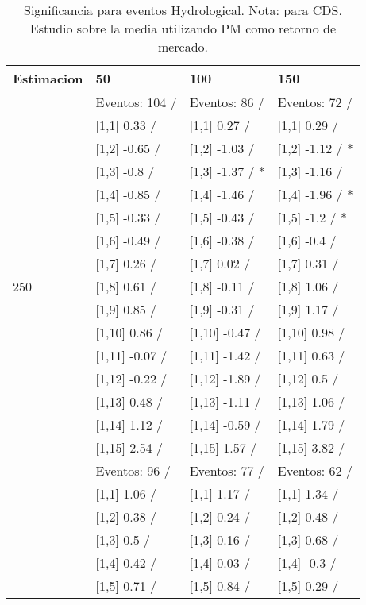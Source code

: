 \begin{table}

\caption{Significancia para eventos Hydrological. Nota: para CDS. Estudio sobre la media utilizando PM como retorno de mercado.}
\centering
\begin{tabular}[t]{llll}
\toprule
Estimacion & 50 & 100 & 150\\
\midrule
 & Eventos:  104 / & Eventos:  86 / & Eventos:  72 /\\
 & {}[1,1] 0.33  / & {}[1,1] 0.27  / & {}[1,1] 0.29  /\\
 & {}[1,2] -0.65  / & {}[1,2] -1.03  / & {}[1,2] -1.12  / *\\
 & {}[1,3] -0.8  / & {}[1,3] -1.37  / * & {}[1,3] -1.16  /\\
 & {}[1,4] -0.85  / & {}[1,4] -1.46  / & {}[1,4] -1.96  / *\\
\addlinespace
 & {}[1,5] -0.33  / & {}[1,5] -0.43  / & {}[1,5] -1.2  / *\\
 & {}[1,6] -0.49  / & {}[1,6] -0.38  / & {}[1,6] -0.4  /\\
 & {}[1,7] 0.26  / & {}[1,7] 0.02  / & {}[1,7] 0.31  /\\
250 & {}[1,8] 0.61  / & {}[1,8] -0.11  / & {}[1,8] 1.06  /\\
 & {}[1,9] 0.85  / & {}[1,9] -0.31  / & {}[1,9] 1.17  /\\
\addlinespace
 & {}[1,10] 0.86  / & {}[1,10] -0.47  / & {}[1,10] 0.98  /\\
 & {}[1,11] -0.07  / & {}[1,11] -1.42  / & {}[1,11] 0.63  /\\
 & {}[1,12] -0.22  / & {}[1,12] -1.89  / & {}[1,12] 0.5  /\\
 & {}[1,13] 0.48  / & {}[1,13] -1.11  / & {}[1,13] 1.06  /\\
 & {}[1,14] 1.12  / & {}[1,14] -0.59  / & {}[1,14] 1.79  /\\
\addlinespace
 & {}[1,15] 2.54  / & {}[1,15] 1.57  / & {}[1,15] 3.82  /\\
 & Eventos:  96 / & Eventos:  77 / & Eventos:  62 /\\
 & {}[1,1] 1.06  / & {}[1,1] 1.17  / & {}[1,1] 1.34  /\\
 & {}[1,2] 0.38  / & {}[1,2] 0.24  / & {}[1,2] 0.48  /\\
 & {}[1,3] 0.5  / & {}[1,3] 0.16  / & {}[1,3] 0.68  /\\
\addlinespace
 & {}[1,4] 0.42  / & {}[1,4] 0.03  / & {}[1,4] -0.3  /\\
 & {}[1,5] 0.71  / & {}[1,5] 0.84  / & {}[1,5] 0.29  /\\

\end{tabular}
\end{table}
